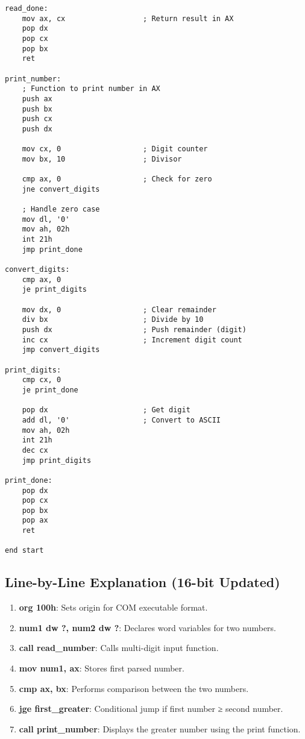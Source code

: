 \documentclass[12pt,a4paper]{article}
\begin{document}
\begin{lstlisting}[caption=16-bit Greater Number Program with Multi-Digit Support]
read_done:
    mov ax, cx                  ; Return result in AX
    pop dx
    pop cx
    pop bx
    ret

print_number:
    ; Function to print number in AX
    push ax
    push bx
    push cx
    push dx
    
    mov cx, 0                   ; Digit counter
    mov bx, 10                  ; Divisor
    
    cmp ax, 0                   ; Check for zero
    jne convert_digits
    
    ; Handle zero case
    mov dl, '0'
    mov ah, 02h
    int 21h
    jmp print_done
    
convert_digits:
    cmp ax, 0
    je print_digits
    
    mov dx, 0                   ; Clear remainder
    div bx                      ; Divide by 10
    push dx                     ; Push remainder (digit)
    inc cx                      ; Increment digit count
    jmp convert_digits
    
print_digits:
    cmp cx, 0
    je print_done
    
    pop dx                      ; Get digit
    add dl, '0'                 ; Convert to ASCII
    mov ah, 02h
    int 21h
    dec cx
    jmp print_digits
    
print_done:
    pop dx
    pop cx
    pop bx
    pop ax
    ret

end start
\end{lstlisting}

\subsection{Line-by-Line Explanation (16-bit Updated)}

\begin{enumerate}
\item \textbf{org 100h}: Sets origin for COM executable format.
\item \textbf{num1 dw ?, num2 dw ?}: Declares word variables for two numbers.
\item \textbf{call read\_number}: Calls multi-digit input function.
\item \textbf{mov num1, ax}: Stores first parsed number.
\item \textbf{cmp ax, bx}: Performs comparison between the two numbers.
\item \textbf{jge first\_greater}: Conditional jump if first number ≥ second number.
\item \textbf{call print\_number}: Displays the greater number using the print function.
\end{enumerate}
\end{document}
